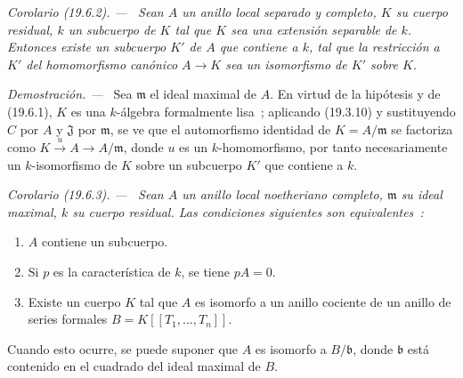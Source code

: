 \documentclass[10pt,oneside]{book}
\makeatletter
\newcommand{\setmanualcurrentlabel}[1]{\def\@currentlabel{#1}}
\newenvironment{corollary}[1][]{%
  \setmanualcurrentlabel{#1}\par\medskip\noindent\itshape Corolario (#1). ---\ }{\par}
\newenvironment{proof}{%
  \par\medskip\noindent\textit{Demostración. ---\ }}{\par}
\makeatother
\begin{document}
\begin{corollary}[19.6.2]
\label{0.19.6.2-es}
Sean $A$ un anillo local separado y completo, $K$ su cuerpo residual, $k$ un
subcuerpo de $K$ tal que $K$ sea una extensión separable de $k$. Entonces
existe un subcuerpo $K'$ de $A$ que contiene a $k$, tal que la restricción a $K'$
del homomorfismo canónico $A\to K$ sea un isomorfismo de $K'$ sobre $K$.
\end{corollary}

\begin{proof}
Sea $\mathfrak m$ el ideal maximal de $A$. En virtud de la hipótesis y de
(19.6.1), $K$ es una $k$-álgebra formalmente lisa~; aplicando (19.3.10) y
sustituyendo $C$ por $A$ y $\mathfrak J$ por $\mathfrak m$, se ve que
el automorfismo identidad de $K=A/\mathfrak m$ se factoriza como
$K\xrightarrow{u}A\to A/\mathfrak m$, donde $u$ es un $k$-homomorfismo, por tanto
necesariamente un $k$-isomorfismo de $K$ sobre un subcuerpo $K'$ que contiene a
$k$.
\end{proof}

\begin{corollary}[19.6.3]
\label{0.19.6.3-es}
Sean $A$ un anillo local noetheriano completo, $\mathfrak m$ su ideal maximal,
$k$ su cuerpo residual. Las condiciones siguientes son equivalentes~:
\begin{enumerate}
  \item[\textup{a)}] $A$ contiene un subcuerpo.
  \item[\textup{b)}] Si $p$ es la característica de $k$, se tiene $pA=0$.
  \item[\textup{c)}] Existe un cuerpo $K$ tal que $A$ es isomorfo a un anillo
  cociente de un anillo de series formales $B=K[[T_1,\ldots,T_n]]$.
\end{enumerate}
Cuando esto ocurre, se puede suponer que $A$ es isomorfo a $B/\mathfrak b$,
donde $\mathfrak b$ está contenido en el cuadrado del ideal maximal de $B$.
\end{corollary}
\end{document}
